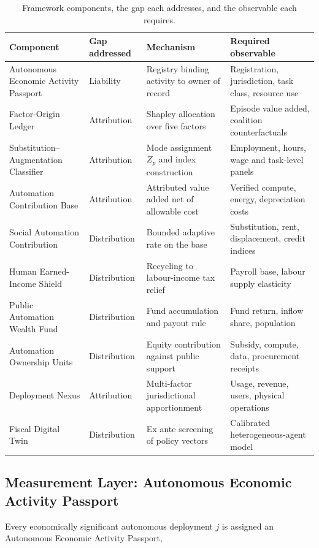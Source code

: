 \documentclass[journal]{IEEEtran}
\theoremstyle{plain}
\theoremstyle{definition}
\begin{document}
\begin{table}[!t]
\centering
\caption{Framework components, the gap each addresses, and the observable each requires.}
\label{tab:components}
\scriptsize
\begin{tabular}{@{}l l l l@{}}
\toprule
\textbf{Component} & \textbf{Gap addressed} & \textbf{Mechanism} & \textbf{Required observable} \\
\midrule
Autonomous Economic Activity Passport & Liability & Registry binding activity to owner of record & Registration, jurisdiction, task class, resource use \\
Factor-Origin Ledger & Attribution & Shapley allocation over five factors & Episode value added, coalition counterfactuals \\
Substitution--Augmentation Classifier & Attribution & Mode assignment $Z_p$ and index construction & Employment, hours, wage and task-level panels \\
Automation Contribution Base & Attribution & Attributed value added net of allowable cost & Verified compute, energy, depreciation costs \\
Social Automation Contribution & Distribution & Bounded adaptive rate on the base & Substitution, rent, displacement, credit indices \\
Human Earned-Income Shield & Distribution & Recycling to labour-income tax relief & Payroll base, labour supply elasticity \\
Public Automation Wealth Fund & Distribution & Fund accumulation and payout rule & Fund return, inflow share, population \\
Automation Ownership Units & Distribution & Equity contribution against public support & Subsidy, compute, data, procurement receipts \\
Deployment Nexus & Attribution & Multi-factor jurisdictional apportionment & Usage, revenue, users, physical operations \\
Fiscal Digital Twin & Distribution & Ex ante screening of policy vectors & Calibrated heterogeneous-agent model \\
\bottomrule
\end{tabular}
\end{table}

\subsection{Measurement Layer: Autonomous Economic Activity Passport}

Every economically significant autonomous deployment $j$ is assigned an Autonomous Economic Activity Passport,
\end{document}
